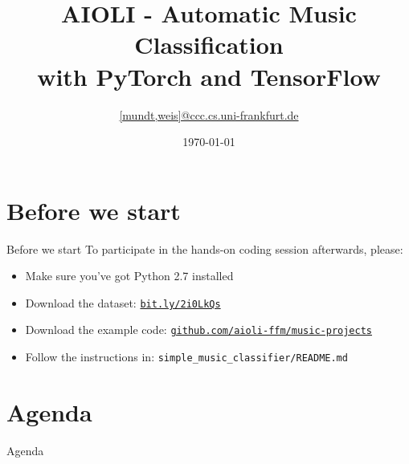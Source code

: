 \documentclass[aspectratio=169]{beamer}
\title{AIOLI - Automatic Music Classification\\with PyTorch and TensorFlow}
\date{\today}
\author{\texorpdfstring{\url{[mundt,weis]@ccc.cs.uni-frankfurt.de}}{Tobias Weis}}
\institute{Systems Engineering for Computer Vision}
\begin{document}
{
\maketitle}


\section{Before we start}
	\begin{frame}{Before we start}
		To participate in the hands-on coding session afterwards, please:
		\begin{itemize}
			\item Make sure you've got Python 2.7 installed
			\item Download the dataset: \href{http://bit.ly/2i0LkQs}{ \texttt{bit.ly/2i0LkQs}}
			\item Download the example code: \href{https://github.com/aioli-ffm/music-projects}{\texttt{github.com/aioli-ffm/music-projects}}
			\item Follow the instructions in: \texttt{simple\_music\_classifier/README.md}
		\end{itemize}
	\end{frame}

\section{Agenda}
	\begin{frame}{Agenda}
		\tableofcontents
	\end{frame}
\end{document}
